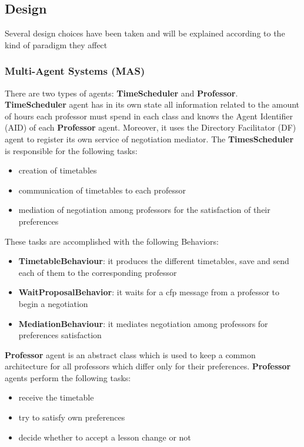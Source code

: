 \subsection{Design}\label{subsec:design}

Several design choices have been taken and will be explained according to the kind of paradigm they
affect

\subsubsection{Multi-Agent Systems (MAS)}\label{subsubsec:mas}
There are two types of agents: \textbf{TimeScheduler} and \textbf{Professor}.\newline
\textbf{TimeScheduler} agent has in its own state all information related to the amount of hours each professor must spend in each class and knows the Agent Identifier (AID) of each \textbf{Professor} agent. Moreover, it uses the Directory Facilitator (DF) agent to register its own service of negotiation mediator.\newline
The \textbf{TimesScheduler} is responsible for the following tasks:
\begin{itemize}
    \item creation of timetables
    \item communication of timetables to each professor
    \item mediation of negotiation among professors for the satisfaction of their preferences
\end{itemize}
These tasks are accomplished with the following Behaviors:
\begin{itemize}
    \item \textbf{TimetableBehaviour}: it produces the different timetables, save and send each of them to the corresponding professor
    \item \textbf{WaitProposalBehavior}: it waits for a cfp message from a professor to begin a negotiation
    \item \textbf{MediationBehaviour}: it mediates negotiation among professors for preferences satisfaction
\end{itemize}
\textbf{Professor} agent is an abstract class which is used to keep a common architecture for all professors which differ only for their preferences.\newline
\textbf{Professor} agents perform the following tasks:
\begin{itemize}
    \item receive the timetable
    \item try to satisfy own preferences
    \item decide whether to accept a lesson change or not
\end{itemize}
